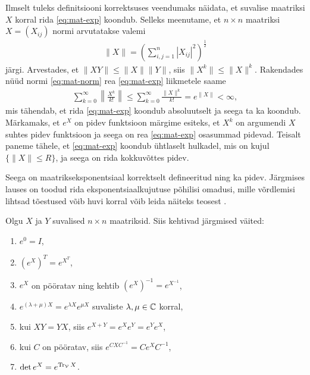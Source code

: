 Ilmselt tuleks definitsiooni korrektsuses veendumaks näidata, et suvalise
maatriksi $X$ korral rida \eqref{eq:mat-exp} koondub. Selleks meenutame,
et $n \times n$ maatriksi $X = (X_{ij})$ normi arvutatakse valemi
\begin{align}\label{eq:mat-norm}
    \| X \| = \left( \sum_{i,j=1}^n |X_{ij}|^2 \right)^{\frac{1}{2}}
\end{align}
järgi. Arvestades, et $\| XY \| \le \|X\| \|Y\|$, siis $\|X^k\| \le \|X\|^k$.
Rakendades nüüd normi \eqref{eq:mat-norm} rea \eqref{eq:mat-exp} liikmetele
saame
\begin{align*}
    \sum_{k=0}^\infty \left\lVert \frac{X^k}{k!} \right\rVert \le
    \sum_{k=0}^\infty \frac{\|X\|^k}{k!} = e^{\|X\|} < \infty,
\end{align*}
mis tähendab, et rida \eqref{eq:mat-exp} koondub absoluutselt ja seega
ta ka koondub. Märkamaks, et $e^X$ on pidev funktsioon märgime esiteks,
et $X^k$ on argumendi $X$ suhtes pidev funktsioon ja seega on rea
\eqref{eq:mat-exp} osasummad pidevad. Teisalt paneme tähele, et
\eqref{eq:mat-exp} koondub ühtlaselt hulkadel, mis on kujul
$\{ \|X\| \le R \}$, ja seega on rida kokkuvõttes pidev.

Seega on maatrikseksponentsiaal korrektselt defineeritud ning ka pidev.
Järgmises lauses on toodud rida eksponentsiaalkujutuse põhilisi omadusi,
mille võrdlemisi lihtsad tõestused võib huvi korral võib leida näiteks
teosest \cite{hall2003lie}.

\begin{lau}\label{lau:mat-exp-om}
    Olgu $X$ ja $Y$ suvalised $n \times n$ maatriksid. Siis kehtivad järgmised
    väited:
    \begin{enumerate}[label=\arabic*)]
        \item\label{om:mat-exp-1} $e^0 = I$,
        \item\label{om:mat-exp-2} $\left(e^X\right)^T = e^{X^T}$,
        \item\label{om:mat-exp-3} $e^X$ on pööratav ning kehtib
            $\left(e^X\right)^{-1} = e^{X^{-1}}$,
        \item\label{om:mat-exp-4} $e^{(\lambda + \mu)X} = e^{\lambda X} e^{\mu X}$ suvaliste
            $\lambda, \mu \in \mathbb{C}$ korral,
        \item\label{om:mat-exp-5} kui $XY = YX$, siis $e^{X+Y} = e^X e^Y = e^Y e^X$,
        \item\label{om:mat-exp-6}  kui $C$ on pööratav, siis $e^{CXC^{-1}} = C e^X C^{-1}$,
        \item\label{om:mat-exp-7} $\det e^X = e^{\operatorname{Tr}_{\mathcal{V}} X}$.
    \end{enumerate}
\end{lau}

